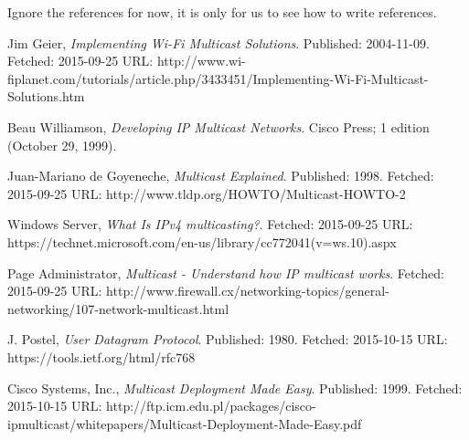 \documentclass[9pt,a4paper]{acmproc}
\begin{document}
\clearpage
Ignore the references for now, it is only for us to see how to write references.
\begin{thebibliography}{9}

  Jim Geier,
  \emph{Implementing Wi-Fi Multicast Solutions}.
  \newline
  Published: 2004-11-09. Fetched: 2015-09-25 \newline
  URL: http://www.wi-fiplanet.com/tutorials/article.php/3433451/Implementing-Wi-Fi-Multicast-Solutions.htm
  
	Beau Williamson,
	\emph{Developing IP Multicast Networks}.
	\newline
Cisco Press; 1 edition (October 29, 1999).

  Juan-Mariano de Goyeneche,
  \emph{Multicast Explained}.
  \newline
  Published: 1998. Fetched: 2015-09-25 \newline
  URL: http://www.tldp.org/HOWTO/Multicast-HOWTO-2
  
  Windows Server,
  \emph{What Is IPv4 multicasting?}.
  \newline
  Fetched: 2015-09-25 \newline
  URL: https://technet.microsoft.com/en-us/library/cc772041(v=ws.10).aspx
  
  Page Administrator,
  \emph{Multicast - Understand how IP multicast works}.
  \newline
  Fetched: 2015-09-25 \newline
  URL: http://www.firewall.cx/networking-topics/general-networking/107-network-multicast.html
  
  J. Postel,
  \emph{User Datagram Protocol}.
  \newline
  Published: 1980. Fetched: 2015-10-15 \newline
  URL: https://tools.ietf.org/html/rfc768
  
  Cisco Systems, Inc.,
  \emph{Multicast Deployment Made Easy}.
  \newline
  Published: 1999. Fetched: 2015-10-15 \newline
  URL: http://ftp.icm.edu.pl/packages/cisco-ipmulticast/whitepapers/Multicast-Deployment-Made-Easy.pdf
  



\end{thebibliography}
\end{document}
